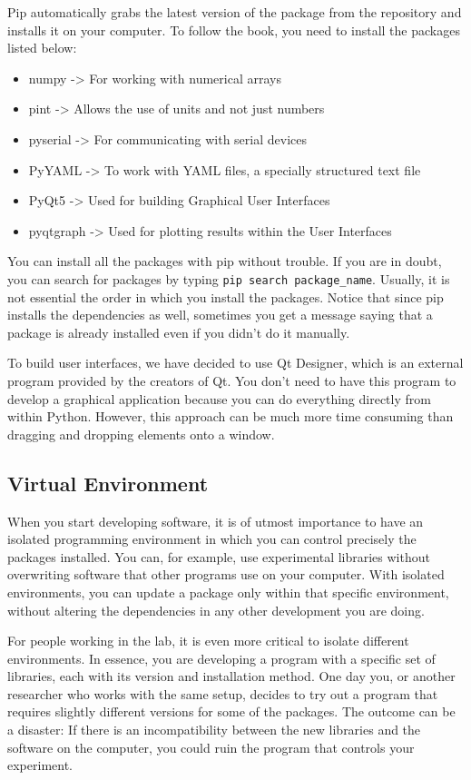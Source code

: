 Pip automatically grabs the latest version of the package from the repository and installs it on your computer. To follow the book, you need to install the packages listed below:
\begin{itemize}
 \item numpy -> For working with numerical arrays
 \item pint -> Allows the use of units and not just numbers
 \item pyserial -> For communicating with serial devices
 \item PyYAML -> To work with YAML files, a specially structured text file
 \item PyQt5 -> Used for building Graphical User Interfaces
 \item pyqtgraph -> Used for plotting results within the User Interfaces
\end{itemize}

\sloppy You can install all the packages with pip without trouble. If you are in doubt, you can search for packages by typing \texttt{pip search package_name}. Usually, it is not essential the order in which you install the packages. Notice that since pip installs the dependencies as well, sometimes you get a message saying that a package is already installed even if you didn't do it manually.

To build user interfaces, we have decided to use Qt Designer, which is an external program provided by the creators of Qt. You don't need to have this program to develop a graphical application because you can do everything directly from within Python. However, this approach can be much more time consuming than dragging and dropping elements onto a window.

\subsection{Virtual Environment}\label{subsec:virtual-environment2}
When you start developing software, it is of utmost importance to have an isolated programming environment in which you can control precisely the packages installed. You can, for example, use experimental libraries without overwriting software that other programs use on your computer. With isolated environments, you can update a package only within that specific environment, without altering the dependencies in any other development you are doing.

For people working in the lab, it is even more critical to isolate different environments. In essence, you are developing a program with a specific set of libraries, each with its version and installation method. One day you, or another researcher who works with the same setup, decides to try out a program that requires slightly different versions for some of the packages. The outcome can be a disaster: If there is an incompatibility between the new libraries and the software on the computer, you could ruin the program that controls your experiment.

